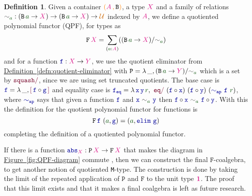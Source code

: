 \documentclass[twoside,11pt,openright]{report}
\theoremstyle{plain} %
\theoremstyle{definition}
\newtheorem{defn}[thm]{Definition}%
\theoremstyle{remark}
\newcommand*{\defref}[1]{\hyperref[defn:#1]{Definition~\ref*{defn:#1}}}
\newcommand*{\figref}[1]{\hyperref[fig:#1]{Figure~\ref*{fig:#1}}}
\newcommand*{\term}[1]{\textcolor{green!30!black}{#1}} %
\newcommand*{\type}[1]{\textcolor{magenta!90!black}{#1}}
\newcommand*{\containerpair}[2]{\ensuremath{\colorlet{savedleftcolor}{.}\color{orange}\left(\color{savedleftcolor}#1\,\textcolor{orange}{\mathbf{,}}\,#2\color{orange}\right)\color{savedleftcolor}}}
\newcommand*{\universe}[1]{\textcolor{orange!80!black}{#1}}
\newcommand*{\unit}{\type{\textbf{1}}}
\newcommand*{\relation}[1]{\textcolor{gray!75!black}{\ensuremath{\mathtt{#1}}}}
\newcommand*{\function}[1]{\textcolor{blue!60!black}{\ensuremath{\mathtt{#1}}}}
\newcommand*{\constructor}[1]{\textcolor{purple!60!black}{\ensuremath{\mathtt{#1}}}}
\newcommand*{\typeformer}[1]{\ensuremath{\mathtt{#1}}}
\newcommand*{\functor}[1]{\ensuremath{\mathbf{\mathtt{#1}}}}
\newcommand*{\quotientconstructor}[1]{\constructor{[}\,#1\,\constructor{]}}
\begin{document}
\begin{defn}
  Given a container \(\containerpair{\type{A}}{\typeformer{B}}\), a type \(\type{X}\) and a family of relations \(\relation{\sim}_{\term{a}} : (\typeformer{B}\,\term{a} \rightarrow \type{X}) \rightarrow (\typeformer{B}\,\term{a} \rightarrow \type{X}) \rightarrow \universe{\mathcal{U}}\) indexed by \(\type{A}\), we define a quotiented polynomial functor (QPF), for types as
  \begin{equation}
    \functor{F}\,\type{X} =  \sum_{(\term{a} : \type{A})} ((\typeformer{B}\,\term{a} \rightarrow \type{X}) / \relation{\sim}_{\term{a}})
  \end{equation}
  and for a function \(\function{f} : \type{X} \rightarrow \type{Y}\), we use the quotient eliminator from \defref{quotient-eliminator} with \(\typeformer{P} = \lambda\,\_, (\typeformer{B}\,\term{a} \rightarrow \type{Y})/\relation{\sim}_{\term{a}}\) which is a set by \(\constructor{squash/}\), since we are using set truncated quotients. The base case is \(\function{f} = \lambda\,\_,\quotientconstructor{\function{f} \circ \function{g}}\) and equality case is \(\function{f_{eq}} = \lambda\,\function{x}\,\function{y}\,\term{r},~\constructor{eq/}~(\function{f} \circ \function{x})~(\function{f} \circ \function{y})~(\function{\sim_{ap}}~\function{f}~\term{r})\), where \(\function{\sim_{ap}}\) says that given a function \(\function{f}\) and \(\function{x}~\relation{\sim}_{\term{a}}~\function{y}\) then \(\function{f} \circ \function{x}~\relation{\sim}_{\term{a}}~\function{f} \circ \function{y}\). With this the definition for the quotient polynomial functor for functions is
  \begin{equation}
    \functor{F}\,\function{f}~(\term{a} , \function{g}) = (\term{a} , \function{elim}~\function{g})
  \end{equation}
  completing the definition of a quotiented polynomial functor.
\end{defn}
\noindent If there is a function \(\function{abs}_{\type{X}} : \functor{P}\,\type{X} \rightarrow \functor{F}\,\type{X}\) that makes the diagram in \figref{QPF-diagram} commute \cite{DBLP:QM-lean}, then we can construct the final \(\functor{F}\)-coalgebra, to get another notion of quotiented \texttt{M}-type. The construction is done by taking the limit of the repeated application of \(\functor{P}\) and \(\functor{F}\) to the unit type \(\unit\). The proof that this limit exists and that it makes a final coalgebra is left as future research.
\end{document}

